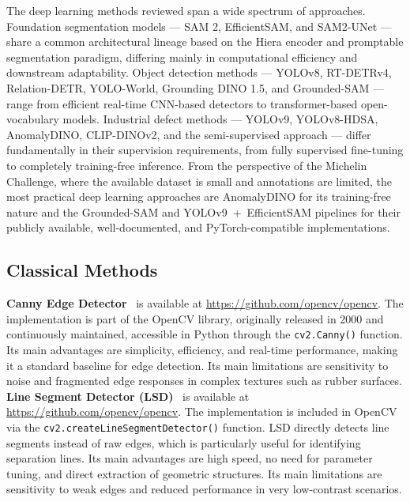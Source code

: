 \documentclass[11pt]{article}
\begin{document}
The deep learning methods reviewed span a wide spectrum of approaches. 
Foundation segmentation models --- SAM 2, EfficientSAM, and SAM2-UNet --- share a 
common architectural lineage based on the Hiera encoder and promptable segmentation 
paradigm, differing mainly in computational efficiency and downstream adaptability. 
Object detection methods --- YOLOv8, RT-DETRv4, Relation-DETR, YOLO-World, 
Grounding DINO 1.5, and Grounded-SAM --- range from efficient real-time CNN-based 
detectors to transformer-based open-vocabulary models. Industrial defect methods 
--- YOLOv9, YOLOv8-HDSA, AnomalyDINO, CLIP-DINOv2, and the semi-supervised 
approach --- differ fundamentally in their supervision requirements, from fully 
supervised fine-tuning to completely training-free inference. From the perspective 
of the Michelin Challenge, where the available dataset is small and annotations are 
limited, the most practical deep learning approaches are AnomalyDINO for its 
training-free nature and the Grounded-SAM and YOLOv9~+~EfficientSAM pipelines for 
their publicly available, well-documented, and PyTorch-compatible implementations.\\

\subsection{Classical Methods}

\textbf{Canny Edge Detector}~\cite{Canny1986} is available at 
\url{https://github.com/opencv/opencv}. The implementation is part of the OpenCV 
library, originally released in 2000 and continuously maintained, accessible in 
Python through the \texttt{cv2.Canny()} function. Its main advantages are 
simplicity, efficiency, and real-time performance, making it a standard baseline 
for edge detection. Its main limitations are sensitivity to noise and fragmented 
edge responses in complex textures such as rubber surfaces.\\

\textbf{Line Segment Detector (LSD)}~\cite{Grompone2010LSD} is available at 
\url{https://github.com/opencv/opencv}. The implementation is included in OpenCV 
via the \texttt{cv2.createLineSegmentDetector()} function. LSD directly detects 
line segments instead of raw edges, which is particularly useful for identifying 
separation lines. Its main advantages are high speed, no need for parameter tuning, 
and direct extraction of geometric structures. Its main limitations are sensitivity 
to weak edges and reduced performance in very low-contrast scenarios.\\
\end{document}
